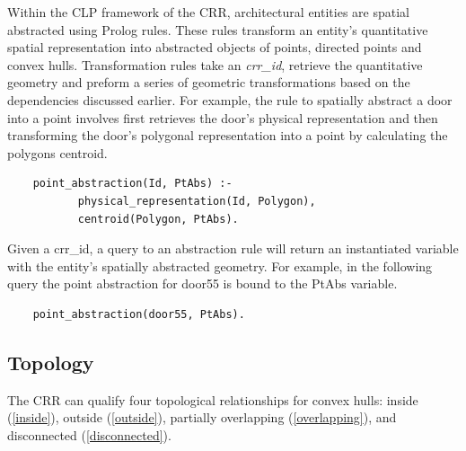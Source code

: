 \documentclass[12pt]{ucthesis}
\begin{document}
Within the CLP framework of the CRR, architectural entities are spatial abstracted using Prolog rules. These rules transform an entity's quantitative spatial representation into abstracted objects of points, directed points and convex hulls. Transformation rules take an \emph{crr\_id}, retrieve the quantitative geometry and preform a series of geometric transformations based on the dependencies discussed earlier. For example, the rule to spatially abstract a door into a point involves first retrieves the door's physical representation and then transforming the door's polygonal representation into a point by calculating the polygons centroid. 
\begin{verbatim}
    point_abstraction(Id, PtAbs) :-
           physical_representation(Id, Polygon),
           centroid(Polygon, PtAbs).
\end{verbatim} Given a crr\_id, a query to an abstraction rule will return an instantiated variable with the entity's spatially abstracted geometry. For example, in the following query the point abstraction for door55 is bound to the PtAbs variable.
\begin{verbatim}
    point_abstraction(door55, PtAbs).
\end{verbatim}





\subsection{Topology}
The CRR can qualify four topological relationships for convex hulls: inside (\ref{inside}), outside (\ref{outside}), partially overlapping (\ref{overlapping}), and disconnected (\ref{disconnected}). 
\end{document}
